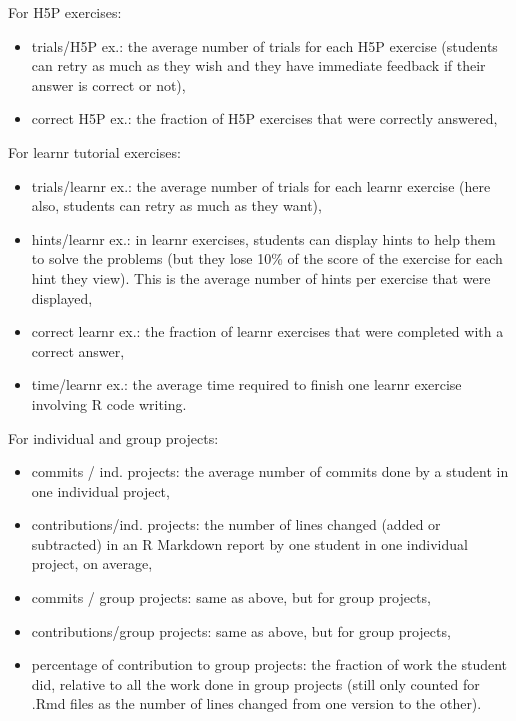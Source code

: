 \documentclass[
]{article}
\providecommand{\tightlist}{%
  \setlength{\itemsep}{0pt}\setlength{\parskip}{0pt}}
\begin{document}
For H5P exercises:

\begin{itemize}
\tightlist
\item
  trials/H5P ex.: the average number of trials for each H5P exercise
  (students can retry as much as they wish and they have immediate
  feedback if their answer is correct or not),
\item
  correct H5P ex.: the fraction of H5P exercises that were correctly
  answered,
\end{itemize}

For learnr tutorial exercises:

\begin{itemize}
\tightlist
\item
  trials/learnr ex.: the average number of trials for each learnr
  exercise (here also, students can retry as much as they want),
\item
  hints/learnr ex.: in learnr exercises, students can display hints to
  help them to solve the problems (but they lose 10\% of the score of
  the exercise for each hint they view). This is the average number of
  hints per exercise that were displayed,
\item
  correct learnr ex.: the fraction of learnr exercises that were
  completed with a correct answer,
\item
  time/learnr ex.: the average time required to finish one learnr
  exercise involving R code writing.
\end{itemize}

For individual and group projects:

\begin{itemize}
\tightlist
\item
  commits / ind. projects: the average number of commits done by a
  student in one individual project,
\item
  contributions/ind. projects: the number of lines changed (added or
  subtracted) in an R Markdown report by one student in one individual
  project, on average,
\item
  commits / group projects: same as above, but for group projects,
\item
  contributions/group projects: same as above, but for group projects,
\item
  percentage of contribution to group projects: the fraction of work the
  student did, relative to all the work done in group projects (still
  only counted for .Rmd files as the number of lines changed from one
  version to the other).
\end{itemize}
\end{document}
